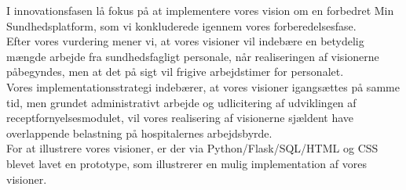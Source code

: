 I innovationsfasen lå fokus på at implementere vores vision om en forbedret Min Sundhedsplatform, som vi konkluderede igennem vores forberedelsesfase.\\
Efter vores vurdering mener vi, at vores visioner vil indebære en betydelig mængde arbejde fra sundhedsfagligt personale, når realiseringen af visionerne påbegyndes, men at det på sigt vil frigive arbejdstimer for personalet.\\
Vores implementationsstrategi indebærer, at vores visioner igangsættes på samme tid, men grundet administrativt arbejde og udlicitering af udviklingen af receptfornyelsesmodulet, vil vores realisering af visionerne sjældent have overlappende belastning på hospitalernes arbejdsbyrde.\\
For at illustrere vores visioner, er der via Python/Flask/SQL/HTML og CSS blevet lavet en prototype, som illustrerer en mulig implementation af vores visioner.\\
